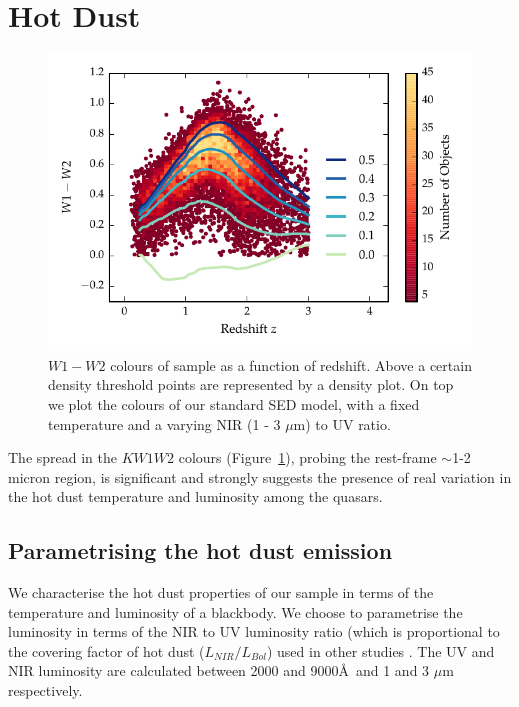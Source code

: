 \section{Hot Dust}

\begin{figure}
\centering
\includegraphics[width=\columnwidth]{figures/chapter05/w1w2_versus_redshift_ratio.pdf}
\caption[{$W1 - W2$ colours of sample as a function of redshift.}]{$W1 - W2$ colours of sample as a function of redshift. Above a certain density threshold points are represented by a density plot. On top we plot the colours of our standard SED model, with a fixed temperature and a varying NIR (1 - 3 $\mu$m) to UV ratio.}
  \label{fig:w1w2colorsratio}
\end{figure}

The spread in the $KW1W2$ colours (Figure~\ref{fig:w1w2colorsratio}), probing the rest-frame $\sim$1-2 micron region, is significant and strongly suggests the presence of real variation in the hot dust temperature and luminosity among the quasars. 

\subsection{Parametrising the hot dust emission}

We characterise the hot dust properties of our sample in terms of the temperature and luminosity of a blackbody.  
We choose to parametrise the luminosity in terms of the NIR to UV luminosity ratio (which is proportional to the covering factor of hot dust ($L_{NIR}/L_{Bol}$) used in other studies \citep{roseboom13}. 
The UV and NIR luminosity are calculated between 2000 and 9000\AA\, and 1 and 3 $\mu$m respectively.

